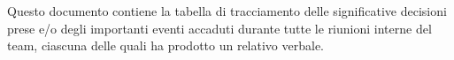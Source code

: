 Questo documento contiene la tabella di tracciamento delle significative decisioni prese e/o degli importanti eventi accaduti durante tutte le riunioni interne del team, ciascuna delle quali ha prodotto un relativo verbale.